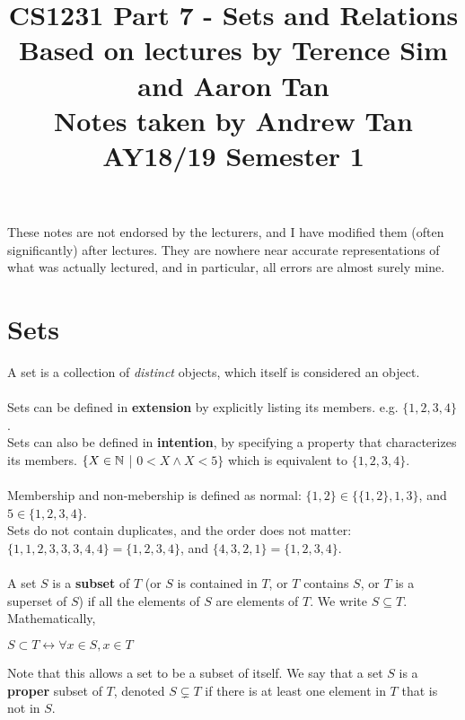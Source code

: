 \documentclass[a4paper]{article}
\title{%
	CS1231 Part 7 - Sets and Relations  \\
	\large Based on lectures by Terence Sim and Aaron Tan
	\\ Notes taken by Andrew Tan
	\\ AY18/19 Semester 1
	\\ }
\author{}
\date{\vspace{-5ex}}
\begin{document}
\maketitle

\begin{center}\begin{minipage}[c]{0.9\textwidth}\centering\footnotesize These notes are not endorsed by the lecturers, and I have modified them (often significantly) after lectures. They are nowhere near accurate representations of what was actually lectured, and in particular, all errors are almost surely mine.\end{minipage}\end{center}

\section{Sets}
A set is a collection of \textit{distinct} objects, which itself is considered an object.\\ \\
Sets can be defined in \textbf{extension} by explicitly listing its members. e.g. $\{1,2,3,4\}$.\\
Sets can also be defined in \textbf{intention}, by specifying a property that characterizes its members.
$\{X \in \mathbb{N}$ | $0 < X \land X < 5\}$ which is equivalent to $\{1,2,3,4\}$.\\ \\
Membership and non-mebership is defined as normal: $\{1,2\}\in \{\{1,2\},1,3\}$, and $5\in \{1,2,3,4\}$.\\
Sets do not contain duplicates, and the order does not matter:
$\{1,1,2,3,3,3,4,4\} = \{1,2,3,4\}$, and $\{4,3,2,1\} = \{1,2,3,4\}$.\\ \\
A set $S$ is a \textbf{subset} of $T$ (or $S$ is contained in $T$, or $T$ contains $S$, or $T$ is a superset of $S$) if all the elements of $S$ are elements of $T$. We write $S \subseteq T$. Mathematically,
\begin{center}
	$S\subset T \leftrightarrow \forall x \in S, x \in T$
\end{center}
Note that this allows a set to be a subset of itself. We say that a set $S$ is a \textbf{proper} subset of $T$, denoted $S\subsetneq T$ if there is at least one element in $T$ that is not in $S$.\\ \\
\end{document}
